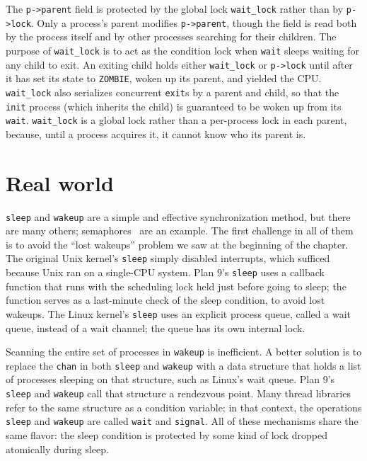 The \lstinline{p->parent} field is protected by the global lock
\lstinline{wait_lock} rather than by \lstinline{p->lock}.
Only a process's parent modifies \lstinline{p->parent}, though
the field is read both by the process itself and by other
processes searching for their children. The purpose of 
\lstinline{wait_lock} is to act as the condition lock when
\lstinline{wait} sleeps waiting for any child to exit. An
exiting child holds either \lstinline{wait_lock} or \lstinline{p->lock}
until after it has set its state to \lstinline{ZOMBIE}, woken
up its parent, and yielded the CPU. \lstinline{wait_lock} also
serializes concurrent \lstinline{exit}s by a parent and child,
so that the \lstinline{init} process (which inherits the child)
is guaranteed to be woken up from its \lstinline{wait}.
\lstinline{wait_lock} is a global lock rather than a per-process
lock in each parent, because, until a process acquires it,
it cannot know who its parent is.

\section{Real world}

\lstinline{sleep}
and
\lstinline{wakeup}
are a simple and effective synchronization method,
but there are many others;
semaphores~\cite{dijkstra65} are an example.
The first challenge in all of them is to
avoid the ``lost wakeups'' problem we saw at the
beginning of the chapter.
The original Unix kernel's
\lstinline{sleep}
simply disabled interrupts,
which sufficed because Unix ran on a single-CPU system.
Plan 9's 
\lstinline{sleep}
uses a callback function that runs with the scheduling
lock held just before going to sleep;
the function serves as a last-minute check
of the sleep condition, to avoid lost wakeups.
The Linux kernel's
\lstinline{sleep}
uses an explicit process queue, called a wait queue, instead of
a wait channel; the queue has its own internal lock.

Scanning the entire set of processes in
\lstinline{wakeup}
is inefficient.  A better solution is to
replace the
\lstinline{chan}
in both
\lstinline{sleep}
and
\lstinline{wakeup}
with a data structure that holds
a list of processes sleeping on that structure,
such as Linux's wait queue.
Plan 9's
\lstinline{sleep}
and
\lstinline{wakeup}
call that structure a rendezvous point.
Many thread libraries refer to the same
structure as a condition variable;
in that context, the operations
\lstinline{sleep}
and
\lstinline{wakeup}
are called
\lstinline{wait}
and
\lstinline{signal}.
All of these mechanisms share the same
flavor: the sleep condition is protected by
some kind of lock dropped atomically during sleep.

